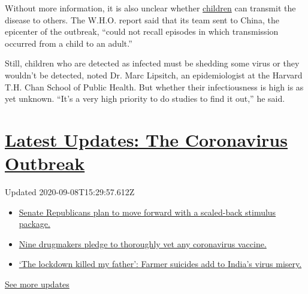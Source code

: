 Without more information, it is also unclear whether
\href{https://www.nytimes3xbfgragh.onion/2020/05/11/health/coronavirus-children-icu.html}{children}
can transmit the disease to others. The W.H.O. report said that its team
sent to China, the epicenter of the outbreak, ``could not recall
episodes in which transmission occurred from a child to an adult.''

Still, children who are detected as infected must be shedding some virus
or they wouldn't be detected, noted Dr. Marc Lipsitch, an epidemiologist
at the Harvard T.H. Chan School of Public Health. But whether their
infectiousness is high is as yet unknown. ``It's a very high priority to
do studies to find it out,'' he said.

\hypertarget{latest-updates-the-coronavirus-outbreak}{%
\section{\texorpdfstring{\href{https://www.nytimes3xbfgragh.onion/2020/09/08/world/covid-19-coronavirus.html?action=click\&pgtype=Article\&state=default\&region=MAIN_CONTENT_1\&context=storylines_live_updates}{Latest
Updates: The Coronavirus
Outbreak}}{Latest Updates: The Coronavirus Outbreak}}\label{latest-updates-the-coronavirus-outbreak}}

Updated 2020-09-08T15:29:57.612Z

\begin{itemize}
\tightlist
\item
  \href{https://www.nytimes3xbfgragh.onion/2020/09/08/world/covid-19-coronavirus.html?action=click\&pgtype=Article\&state=default\&region=MAIN_CONTENT_1\&context=storylines_live_updates\#link-547feae1}{Senate
  Republicans plan to move forward with a scaled-back stimulus package.}
\item
  \href{https://www.nytimes3xbfgragh.onion/2020/09/08/world/covid-19-coronavirus.html?action=click\&pgtype=Article\&state=default\&region=MAIN_CONTENT_1\&context=storylines_live_updates\#link-679303d7}{Nine
  drugmakers pledge to thoroughly vet any coronavirus vaccine.}
\item
  \href{https://www.nytimes3xbfgragh.onion/2020/09/08/world/covid-19-coronavirus.html?action=click\&pgtype=Article\&state=default\&region=MAIN_CONTENT_1\&context=storylines_live_updates\#link-1c973131}{`The
  lockdown killed my father': Farmer suicides add to India's virus
  misery.}
\end{itemize}

\href{https://www.nytimes3xbfgragh.onion/2020/09/08/world/covid-19-coronavirus.html?action=click\&pgtype=Article\&state=default\&region=MAIN_CONTENT_1\&context=storylines_live_updates}{See
more updates}

